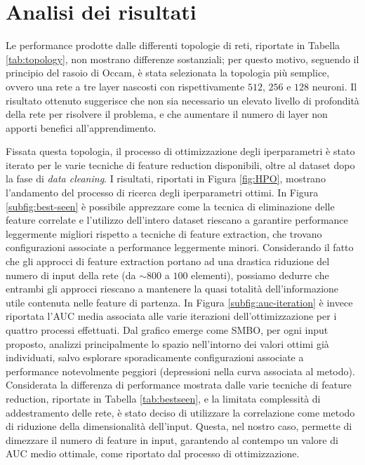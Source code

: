 \section{Analisi dei risultati}
Le performance prodotte dalle differenti topologie di reti, riportate in Tabella \ref{tab:topology}, non mostrano differenze sostanziali; per questo motivo, seguendo il principio del rasoio di Occam, è stata selezionata la topologia più semplice, ovvero una rete a tre layer nascosti con rispettivamente $512$, $256$ e $128$ neuroni. 
Il risultato ottenuto suggerisce che non sia necessario un elevato livello di profondità della rete per risolvere il problema, e che aumentare il numero di layer non apporti benefici all'apprendimento.

Fissata questa topologia, il processo di ottimizzazione degli iperparametri è stato iterato per le varie tecniche di feature reduction disponibili, oltre al dataset dopo la fase di \textit{data cleaning}. 
I risultati, riportati in Figura \ref{fig:HPO}, mostrano l'andamento del processo di ricerca degli iperparametri ottimi. 
In Figura \ref{subfig:best-seen} è possibile apprezzare come la tecnica di eliminazione delle feature correlate e l'utilizzo dell'intero dataset riescano a garantire performance leggermente migliori rispetto a tecniche di feature extraction, che trovano configurazioni associate a performance leggermente minori. 
Considerando il fatto che gli approcci di feature extraction portano ad una drastica riduzione del numero di input della rete (da $\sim800$ a $100$ elementi), possiamo dedurre che entrambi gli approcci riescano a mantenere la quasi totalità dell'informazione utile contenuta nelle feature di partenza. 
In Figura \ref{subfig:auc-iteration} è invece riportata l'AUC media associata alle varie iterazioni dell'ottimizzazione per i quattro processi effettuati. 
Dal grafico emerge come SMBO, per ogni input proposto, analizzi principalmente lo spazio nell'intorno dei valori ottimi già individuati, salvo esplorare sporadicamente configurazioni associate a performance notevolmente peggiori (depressioni nella curva associata al metodo).\\
Considerata la differenza di performance mostrata dalle varie tecniche di feature reduction, riportate in Tabella \ref{tab:bestseen}, e la limitata complessità di addestramento delle rete, è stato deciso di utilizzare la correlazione come metodo di riduzione della dimensionalità dell'input. 
Questa, nel nostro caso, permette di dimezzare il numero di feature in input, garantendo al contempo un valore di AUC medio ottimale, come riportato dal processo di ottimizzazione. 
